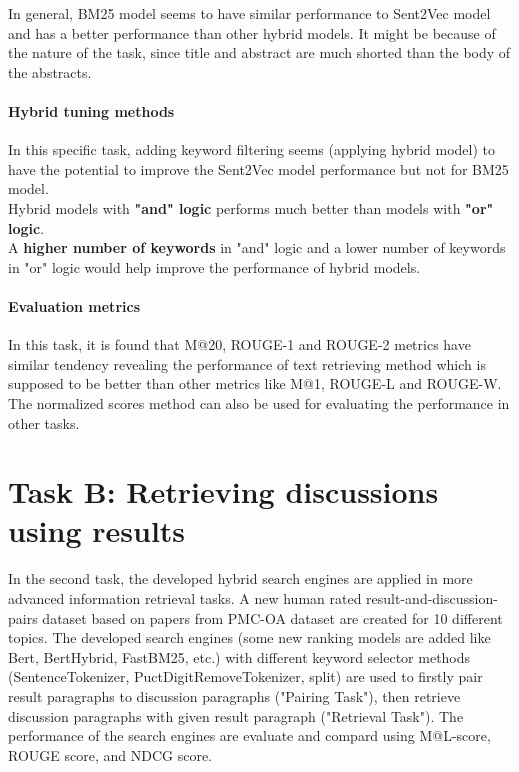 In general, BM25 model seems to have similar performance to Sent2Vec model and has a better performance than other hybrid models.
It might be because of the nature of the task, since title and abstract are much shorted than the body of the abstracts. 

\paragraph{Hybrid tuning methods}

In this specific task, adding keyword filtering seems (applying hybrid model) to have the potential to improve the Sent2Vec model performance but not for BM25 model.\\

Hybrid models with \textbf{"and" logic} performs much better than models with \textbf{"or" logic}.\\

A \textbf{higher number of keywords} in "and" logic and a lower number of keywords in "or" logic would help improve the performance of hybrid models.

\paragraph{Evaluation metrics}

In this task, it is found that M@20, ROUGE-1 and ROUGE-2 metrics have similar tendency revealing the performance of text retrieving method which is supposed to be better than other metrics like M@1, ROUGE-L and ROUGE-W. \\

The normalized scores method can also be used for evaluating the performance in other tasks.

\newpage
\section{Task B: Retrieving discussions using results}

In the second task, the developed hybrid search engines are applied in more advanced information retrieval tasks.
A new human rated result-and-discussion-pairs dataset based on papers from PMC-OA dataset are created for 10 different topics.
The developed search engines (some new ranking models are added like Bert, BertHybrid, FastBM25, etc.) with different keyword selector methods (SentenceTokenizer,  PuctDigitRemoveTokenizer, split) are used to 
firstly pair result paragraphs to discussion paragraphs ("Pairing Task"), 
then retrieve discussion paragraphs with given result paragraph ("Retrieval Task").
The performance of the search engines are evaluate and compard using M@L-score, ROUGE score, and NDCG score.

